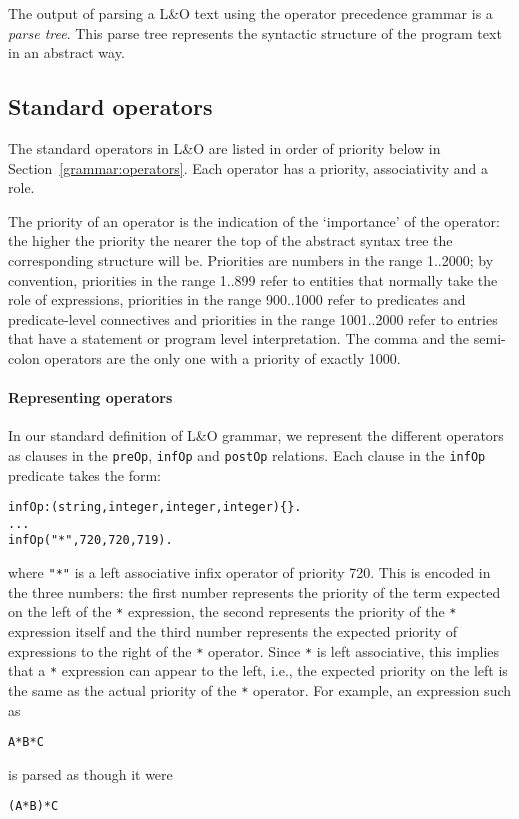The output of parsing a L&O text using the operator precedence grammar is a \emph{parse tree}. This parse tree represents the syntactic structure of the program text in an abstract way.


\subsection{Standard operators}   
The standard operators in L&O are listed in order of priority below in Section~\ref{grammar:operators}. Each operator has a priority, associativity and a role.

The priority of an operator is the indication of the `importance' of the operator: the higher the priority the nearer the top of the abstract syntax tree the corresponding structure will be. Priorities are numbers in the range 1..2000; by convention, priorities in the range 1..899 refer to entities that normally take the role of expressions, priorities in the range 900..1000 refer to predicates and predicate-level connectives and priorities in the range 1001..2000 refer to entries that have a statement or program level interpretation. The comma and the semi-colon operators are the only one with a priority of exactly 1000.



\paragraph{Representing operators}
In our standard definition of L&O grammar, we represent the different operators as clauses in the \verb+preOp+, \verb+infOp+ and \verb+postOp+ relations. Each clause in the \verb+infOp+ predicate takes the form:
\begin{verbatim}
infOp:(string,integer,integer,integer){}.
...
infOp("*",720,720,719).
\end{verbatim}
where \verb+"*"+ is a left associative infix operator of priority 720. This is encoded in the three numbers: the first number represents the priority of the term expected on the left of the \verb+*+ expression, the second represents the priority of the \verb+*+ expression itself and the third number represents the expected priority of expressions to the right of the \verb+*+ operator. Since \verb+*+ is left associative, this implies that a \verb+*+ expression can appear to the left, i.e., the expected priority on the left is the same as the actual priority of the \verb+*+ operator. For example, an expression such as 
\begin{verbatim}
A*B*C
\end{verbatim}
is parsed as though it were
\begin{verbatim}
(A*B)*C
\end{verbatim}

